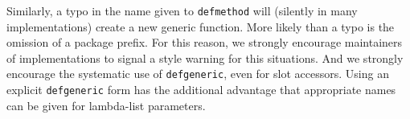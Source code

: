 Similarly, a typo in the name given to \texttt{defmethod} will
(silently in many \commonlisp{} implementations) create a new generic
function.  More likely than a typo is the omission of a package
prefix.  For this reason, we strongly encourage maintainers of
\commonlisp{} implementations to signal a style warning for this
situations.  And we strongly encourage the systematic use of
\texttt{defgeneric}, even for slot accessors.  Using an explicit
\texttt{defgeneric} form has the additional advantage that appropriate
names can be given for lambda-list parameters.

